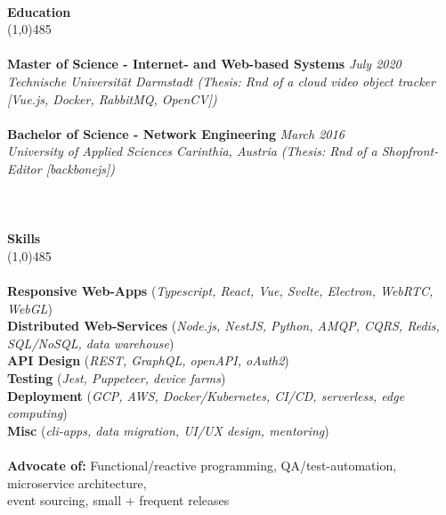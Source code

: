 \documentclass[9pt]{extarticle}
\newcommand\tab[1][1cm]{\hspace*{#1}}
\newcommand\smallspace[1][0.23cm]{\hspace*{#1}}
\newcommand\negativespace[1][-0.12cm]{\hspace*{#1}}
\begin{document}

\noindent %
\\
\vspace*{-6pt}
{\negativespace \Large \bf Education}\\
\line(1,0){485}\\
\\
\noindent
{\bf Master of Science - Internet- and Web-based Systems} \hfill \textit{July 2020} \\ 
\textit{Technische Universität Darmstadt (Thesis: Rnd of a cloud video object tracker [Vue.js, Docker, RabbitMQ, OpenCV])}\\\\
\noindent
{\bf Bachelor of Science - Network Engineering} \hfill \textit{March 2016} \\
\textit{University of Applied Sciences Carinthia, Austria (Thesis: Rnd of a Shopfront-Editor [backbonejs])}\\
\\
\\\\
\vspace*{-6pt}
{\negativespace \Large \bf Skills}\\
\line(1,0){485}\\
\\
\noindent
{\bf Responsive Web-Apps } (\textit{Typescript, React, Vue, Svelte, Electron, WebRTC, WebGL}) \\
{\bf Distributed Web-Services } (\textit{Node.js, NestJS, Python, AMQP, CQRS, Redis, SQL/NoSQL, data warehouse}) \\
{\bf API Design }(\textit{REST, GraphQL, openAPI, oAuth2}) \\
{\bf Testing }(\textit{Jest, Puppeteer, device farms}) \\
{\bf Deployment }(\textit{GCP, AWS, Docker/Kubernetes, CI/CD, serverless, edge computing}) \\
{\bf Misc }(\textit{cli-apps, data migration, UI/UX design, mentoring}) \\\\
\noindent
{\bf Advocate of:} Functional/reactive programming, QA/test-automation, microservice architecture,\\ 
 \tab \tab \smallspace event sourcing, small + frequent releases
\end{document}
